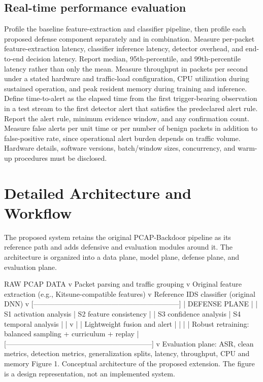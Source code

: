 \documentclass[11pt]{article}
\begin{document}
\subsection{Real-time performance evaluation}
Profile the baseline feature-extraction and classifier pipeline, then profile each proposed defense component separately and in combination. Measure per-packet feature-extraction latency, classifier inference latency, detector overhead, and end-to-end decision latency. Report median, 95th-percentile, and 99th-percentile latency rather than only the mean. Measure throughput in packets per second under a stated hardware and traffic-load configuration, CPU utilization during sustained operation, and peak resident memory during training and inference. Define time-to-alert as the elapsed time from the first trigger-bearing observation in a test stream to the first detector alert that satisfies the predeclared alert rule. Report the alert rule, minimum evidence window, and any confirmation count. Measure false alerts per unit time or per number of benign packets in addition to false-positive rate, since operational alert burden depends on traffic volume. Hardware details, software versions, batch/window sizes, concurrency, and warm-up procedures must be disclosed.

\section{Detailed Architecture and Workflow}
The proposed system retains the original PCAP-Backdoor pipeline as its reference path and adds defensive and evaluation modules around it. The architecture is organized into a data plane, model plane, defense plane, and evaluation plane.

RAW PCAP DATA v Packet parsing and traffic grouping v Original feature extraction (e.g., Kitsune-compatible features) v Reference IDS classifier (original DNN) v [--------------------------------------------------------------] | DEFENSE PLANE                                    | | S1 activation analysis | S2 feature consistency         | | S3 confidence analysis | S4 temporal analysis            | |            v                         | |       Lightweight fusion and alert                | |                                      | | Robust retraining: balanced sampling + curriculum + replay | [--------------------------------------------------------------] v Evaluation plane: ASR, clean metrics, detection metrics, generalization splits, latency, throughput, CPU and memory Figure 1. Conceptual architecture of the proposed extension. The figure is a design representation, not an implemented system.
\end{document}
